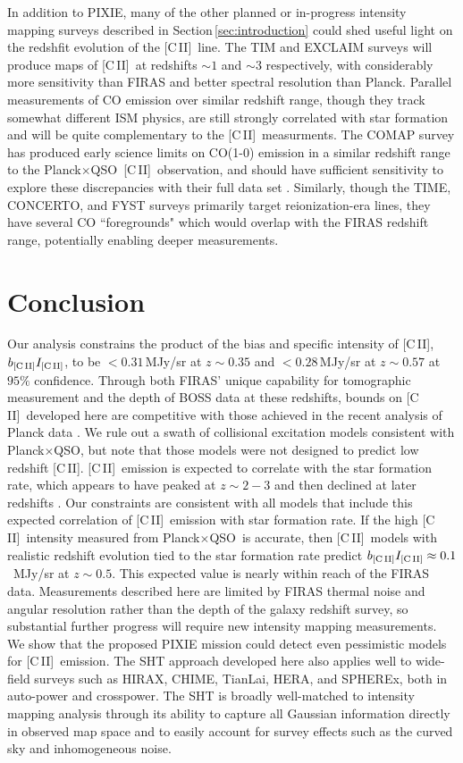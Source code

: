 \documentclass[fleqn,usenatbib]{mnras}
\newcommand{\cii}{[C{\sc\,II}]}
\newcommand{\PB}{Planck${\times}$QSO}
\begin{document}
In addition to PIXIE, many of the other planned or in-progress intensity mapping surveys described in Section\,\ref{sec:introduction} could shed useful light on the redshfit evolution of the \cii\ line.  The TIM and EXCLAIM surveys will produce maps of \cii\ at redshifts $\sim1$ and $\sim3$ respectively, with considerably more sensitivity than FIRAS and better spectral resolution than Planck.  Parallel measurements of CO emission over similar redshift range, though they track somewhat different ISM physics, are still strongly correlated with star formation and will be quite complementary to the \cii\ measurments.  The COMAP survey has produced early science limits on CO(1-0) emission in a similar redshift range to the \PB\ \cii\ observation, and should have sufficient sensitivity to explore these discrepancies with their full data set \citep{Chung2021,Breysse2021}.  Similarly, though the TIME, CONCERTO, and FYST surveys primarily target reionization-era lines, they have several CO ``foregrounds" which would overlap with the FIRAS redshift range, potentially enabling deeper measurements.

\section{Conclusion}
\label{sec:Conclusion}

Our analysis constrains the product of the bias and specific intensity of \cii, $b_{\rm \cii}I_{\rm \cii}$, to be ${<}0.31$\,MJy/sr at $z{\sim}0.35$ and ${<}0.28$\,MJy/sr at $z{\sim}0.57$ at $95\%$ confidence. Through both FIRAS' unique capability for tomographic measurement and the depth of BOSS data at these redshifts, bounds on \cii\ developed here are competitive with those achieved in the recent analysis of Planck data \citep{yang2019evidence, pullen2018search}. We rule out a swath of collisional excitation models consistent with \PB, but note that those models were not designed to predict low redshift \cii. \cii\ emission is expected to correlate with the star formation rate, which appears to have peaked at $z \sim 2 - 3$ and then declined at later redshifts \citep{Madau2014}. Our constraints are consistent with all models that include this expected correlation of \cii\ emission with star formation rate. If the high \cii\ intensity measured from \PB\ is accurate, then \cii\ models with realistic redshift evolution tied to the star formation rate predict $b_{\rm \cii}I_{\rm \cii} \approx 0.1$\ MJy/sr at $z\sim0.5$. This expected value is nearly within reach of the FIRAS data. Measurements described here are limited by FIRAS thermal noise and angular resolution rather than the depth of the galaxy redshift survey, so substantial further progress will require new intensity mapping measurements. We show that the proposed PIXIE mission could detect even pessimistic models for \cii\ emission. The SHT approach developed here also applies well to wide-field surveys such as HIRAX, CHIME, TianLai, HERA, and SPHEREx, both in auto-power and crosspower. The SHT is broadly well-matched to intensity mapping analysis through its ability to capture all Gaussian information directly in observed map space and to easily account for survey effects such as the curved sky and inhomogeneous noise.
\end{document}
